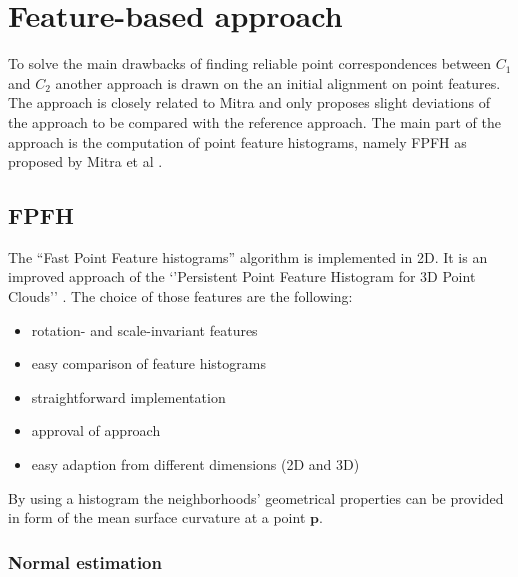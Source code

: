 \chapter{Feature-based approach}
\label{cha:FeatureApproach}

To solve the main drawbacks of finding reliable point correspondences between $C_1$ and $C_2$ another approach is drawn on the an initial alignment on point features. The approach is closely related to Mitra \cite{Mitra07} and only proposes slight deviations of the approach to be compared with the reference approach. The main part of the approach is the computation of point feature histograms, namely FPFH \cite{FPFH} as proposed by Mitra et al \cite{Mitra07}.

\section{FPFH}
\label{FPFH}
The ``Fast Point Feature histograms'' algorithm is implemented in 2D. It is an improved approach of the `'Persistent Point Feature Histogram for 3D Point Clouds'' \cite{PPFH}. The choice of those features are the following: 
\begin{itemize}
	\item rotation- and scale-invariant features
	\item easy comparison of feature histograms
	\item straightforward implementation
	\item approval of approach
	\item easy adaption from different dimensions (2D and 3D)
\end{itemize}
By using a histogram the neighborhoods' geometrical properties can be provided in form of the mean surface curvature at a point $\boldsymbol{p}$. 

\subsection{Normal estimation}

